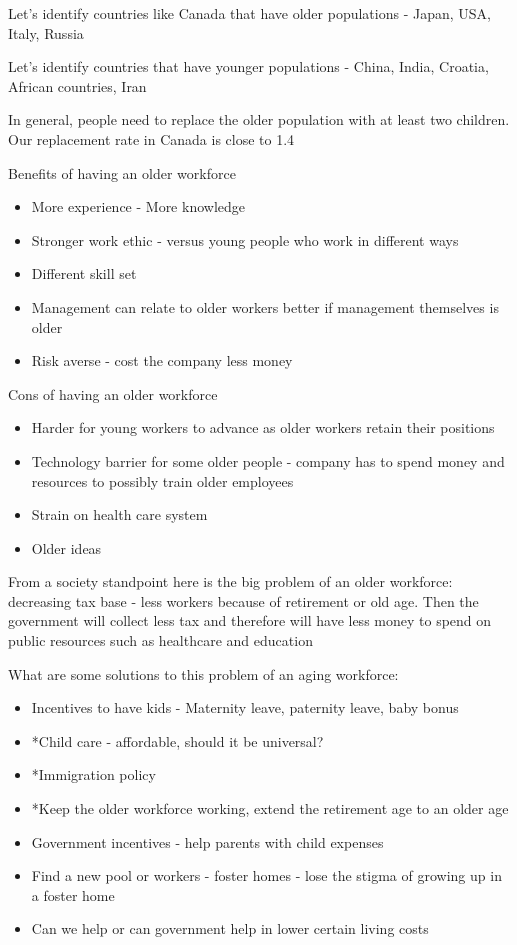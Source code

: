 \documentclass[11pt]{article}
\begin{document}
Let's identify countries like Canada that have older populations - Japan, USA, Italy, Russia

Let's identify countries that have younger populations - China, India, Croatia, African countries, Iran

In general, people need to replace the older population with at least two children. Our replacement rate in Canada is close to 1.4

Benefits of having an older workforce 

\begin{itemize}
    \item More experience - More knowledge
    \item Stronger work ethic - versus young people who work in different ways
    \item Different skill set
    \item Management can relate to older workers better if management themselves is older
    \item Risk averse - cost the company less money 
\end{itemize}

Cons of having an older workforce

\begin{itemize}
    \item Harder for young workers to advance as older workers retain their positions
    \item Technology barrier for some older people - company has to spend money and resources to possibly train older employees
    \item Strain on health care system
    \item Older ideas
\end{itemize}

From a society standpoint here is the big problem of an older workforce: decreasing tax base - less workers because of retirement or old age. Then the government will collect less tax and therefore will have less money to spend on public resources such as healthcare and education

What are some solutions to this problem of an aging workforce: 

\begin{itemize}
    \item Incentives to have kids - Maternity leave, paternity leave, baby bonus
    \item *Child care - affordable, should it be universal?
    \item *Immigration policy 
    \item *Keep the older workforce working, extend the retirement age to an older age
    \item Government incentives - help parents with child expenses
    \item Find a new pool or workers - foster homes - lose the stigma of growing up in a foster home
    \item Can we help or can government help in lower certain living costs
\end{itemize}
\end{document}
